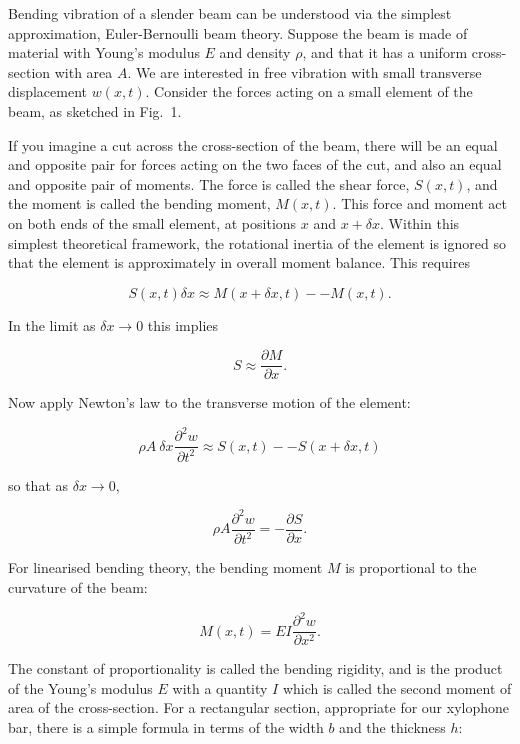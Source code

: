   Bending vibration of a slender beam can be understood via the simplest 
  approximation, Euler-Bernoulli beam theory. Suppose the beam is made of 
  material with Young's modulus $E$ and density $\rho$, and that it has a 
  uniform cross-section with area $A$. We are interested in free vibration with 
  small transverse displacement $w(x,t)$. Consider the forces acting on a small 
  element of the beam, as sketched in Fig.\ 1. 


  If you imagine a cut across the cross-section of the beam, there will be an 
  equal and opposite pair for forces acting on the two faces of the cut, and 
  also an equal and opposite pair of moments. The force is called the shear 
  force, $S(x,t)$, and the moment is called the bending moment, $M(x,t)$. This 
  force and moment act on both ends of the small element, at positions $x$ and 
  $x + \delta x$. Within this simplest theoretical framework, the rotational 
  inertia of the element is ignored so that the element is approximately in 
  overall moment balance. This requires 

  $$S(x,t) \delta x \approx M(x+ \delta x,t) -- M(x,t). \tag{1}$$ 

  In the limit as $\delta x \rightarrow 0$ this implies 

  $$S \approx \dfrac{\partial M}{\partial x} . \tag{2}$$ 

  Now apply Newton's law to the transverse motion of the element: 

  $$\rho A ~\delta x \dfrac{\partial^2 w}{\partial t^2} \approx S(x,t) -- 
  S(x+\delta x,t) \tag{3}$$ 

  so that as $\delta x \rightarrow 0$, 

  $$\rho A \dfrac{\partial^2 w}{\partial t^2} = -\dfrac{\partial S}{\partial 
  x}. \tag{4}$$ 

  For linearised bending theory, the bending moment $M$ is proportional to the 
  curvature of the beam: 

  $$M(x,t) = EI\dfrac{\partial^2 w}{\partial x^2} . \tag{5}$$ 

  The constant of proportionality is called the bending rigidity, and is the 
  product of the Young's modulus $E$ with a quantity $I$ which is called the 
  second moment of area of the cross-section. For a rectangular section, 
  appropriate for our xylophone bar, there is a simple formula in terms of the 
  width $b$ and the thickness $h$: 

